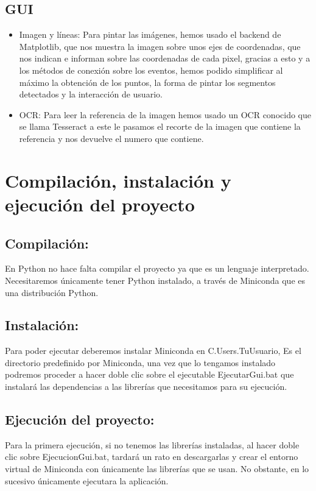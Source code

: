 \subsection{GUI}

\begin{itemize}
	\item Imagen y líneas: Para pintar las imágenes, hemos usado el backend de Matplotlib, que nos muestra la imagen sobre unos ejes de coordenadas, que nos indican e informan sobre las coordenadas de cada pixel, gracias a esto y a los métodos de conexión sobre los eventos, hemos podido simplificar al máximo la obtención de los puntos, la forma de pintar los segmentos detectados y la interacción de usuario.
	
	\item OCR: Para leer la referencia de la imagen hemos usado un OCR conocido que se llama Tesseract a este le pasamos el recorte de la imagen que contiene la referencia y nos devuelve el numero que contiene.
\end{itemize}

\section{Compilación, instalación y ejecución del proyecto}

\subsection{Compilación:}
En Python no hace falta compilar el proyecto ya que es un lenguaje interpretado. Necesitaremos únicamente tener Python instalado, a través de Miniconda que es una distribución Python.

\subsection{Instalación:}
Para poder ejecutar deberemos instalar Miniconda en 
 \textrm{C.Users.TuUsuario}, Es el directorio predefinido por Miniconda, una vez que lo tengamos instalado podremos proceder a hacer doble clic sobre el ejecutable  \textrm{EjecutarGui.bat} que instalará las dependencias a las librerías que necesitamos para su ejecución.

\subsection{Ejecución del proyecto:}
Para la primera ejecución, si no tenemos las librerías instaladas, al hacer doble clic sobre EjecucionGui.bat, tardará un rato en descargarlas y crear el entorno virtual de Miniconda con únicamente las librerías que se usan. No obstante, en lo sucesivo únicamente ejecutara la aplicación.

